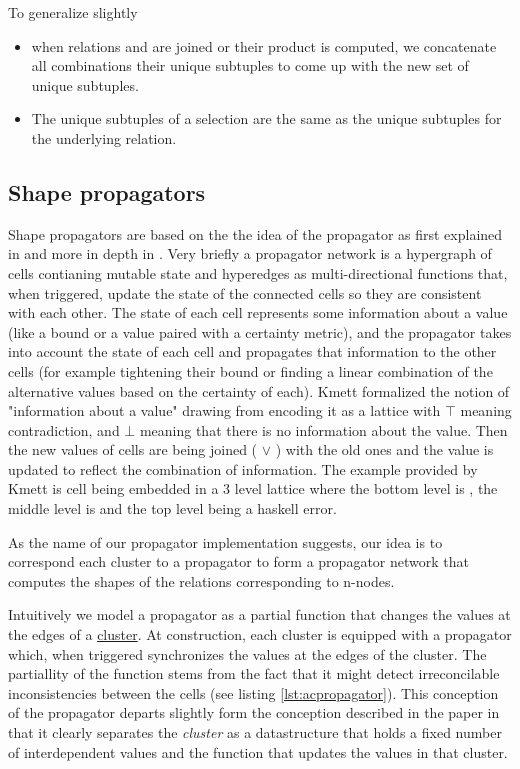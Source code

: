 To generalize slightly

\begin{itemize}
\item when relations  and  are joined or their product is computed,
  we concatenate all combinations their unique subtuples to come up
  with the new set of unique subtuples.
\item The unique subtuples of a selection are the same as the unique
  subtuples for the underlying relation.
\end{itemize}

\subsection{Shape propagators}
\label{sec:org089acdd}

Shape propagators are based on the the idea of the propagator as first
explained in \cite{sussmanArtPropagator2009} and more in depth in
\cite{hansonSoftwareDesignFlexibility2021a}. Very briefly a propagator
network is a hypergraph of cells contianing mutable state and
hyperedges as multi-directional functions that, when triggered, update
the state of the connected cells so they are consistent with each
other. The state of each cell represents some information about a
value (like a bound or a value paired with a certainty metric), and
the propagator takes into account the state of each cell and
propagates that information to the other cells (for example tightening
their bound or finding a linear combination of the alternative values
based on the certainty of each). Kmett \cite{kmettPropagators2021}
formalized the notion of "information about a value" drawing from
\cite{kuperLVarsLatticebasedData2013} encoding it as a lattice with
\(\top\) meaning contradiction, and \(\bot\) meaning that there is no
information about the value. Then the new values of cells are being
joined ( \(\lor\) ) with the old ones and the value is updated to
reflect the combination of information. The example provided by Kmett
is cell being embedded in a 3 level lattice where the bottom level is
, the middle level is  and the top level
being a haskell error.

As the name of our propagator implementation suggests, our idea is to
correspond each cluster to a propagator to form a propagator network
that computes the shapes of the relations corresponding to n-nodes.

Intuitively we model a propagator as a partial function that changes
the values at the edges of a \hyperref[sec:org6e4b098]{cluster}. At
construction, each cluster is equipped with a propagator which, when
triggered synchronizes the values at the edges of the cluster. The
partiallity of the function stems from the fact that it might detect
irreconcilable inconsistencies between the cells (see listing
\ref{lst:acpropagator}). This conception of the propagator departs slightly
form the conception described in the paper in that it clearly
separates the \emph{cluster} as a datastructure that holds a fixed
number of interdependent values and the function that updates the
values in that cluster.

